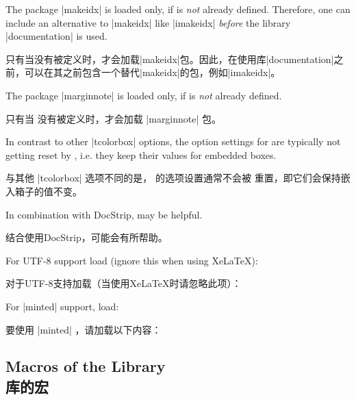 \begin{marker}
The package |makeidx| is loaded only, if  is
\emph{not} already defined. Therefore, one can include an alternative to |makeidx| like
|imakeidx| \emph{before} the library |documentation| is used.

只有当没有被定义时，才会加载|makeidx|包。因此，在使用库|documentation|之前，可以在其之前包含一个替代|makeidx|的包，例如|imakeidx|。
\end{marker}
\begin{marker}
The package |marginnote| is loaded only, if  is
\emph{not} already defined.

只有当  没有被定义时，才会加载 |marginnote| 包。
\end{marker}
\begin{marker}
In contrast to other |tcolorbox| options, the option
settings for  are typically not
getting reset by , i.e. they keep their
values for embedded boxes.

与其他 |tcolorbox| 选项不同的是， 的选项设置通常不会被  重置，即它们会保持嵌入箱子的值不变。
\end{marker}
\begin{marker}
In combination with DocStrip,  may be helpful.

结合使用DocStrip，可能会有所帮助。
\end{marker}

For UTF-8 support load (ignore this when using Xe\LaTeX):

对于UTF-8支持加载（当使用Xe\LaTeX 时请忽略此项）：
\begin{dispListing}
\end{dispListing}

For |minted| \cite{poore:minted} support, load:

要使用 |minted| \cite{poore:minted}，请加载以下内容：
\begin{dispListing}
\end{dispListing}



\subsection{Macros of the Library\\库的宏}


